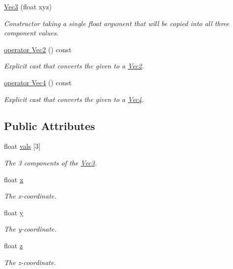 \begin{DoxyCompactItemize}
\hyperlink{classgfxmath_1_1_vec3_aa9067613452e593627e33477cd4b63a3}{Vec3} (float xyz)
\begin{DoxyCompactList}\small\item\em Constructor taking a single float argument that will be copied into all three component values. \end{DoxyCompactList}\item 
\hyperlink{classgfxmath_1_1_vec3_a75e16fdee00a8ad1c6bb3e8d129bf9a5}{operator Vec2} () const 
\begin{DoxyCompactList}\small\item\em Explicit cast that converts the given to a \hyperlink{classgfxmath_1_1_vec2}{Vec2}. \end{DoxyCompactList}\item 
\hyperlink{classgfxmath_1_1_vec3_a63202163a9e528a6bd3a432b3b4ca686}{operator Vec4} () const 
\begin{DoxyCompactList}\small\item\em Explicit cast that converts the given to a \hyperlink{classgfxmath_1_1_vec4}{Vec4}. \end{DoxyCompactList}\end{DoxyCompactItemize}
\subsection*{Public Attributes}
\begin{DoxyCompactItemize}
\item 
float \hyperlink{classgfxmath_1_1_vec3_a9ce2feb7167c9fd1d521838da1daa7f9}{vals} \mbox{[}3\mbox{]}
\begin{DoxyCompactList}\small\item\em The 3 components of the \hyperlink{classgfxmath_1_1_vec3}{Vec3}. \end{DoxyCompactList}\item 
float \hyperlink{classgfxmath_1_1_vec3_adb7cecf3b6d25eecf3924583f41d8c3a}{x}
\begin{DoxyCompactList}\small\item\em The x-\/coordinate. \end{DoxyCompactList}\item 
float \hyperlink{classgfxmath_1_1_vec3_a398bee406395fdc1ad381f5b70d7fd99}{y}
\begin{DoxyCompactList}\small\item\em The y-\/coordinate. \end{DoxyCompactList}\item 
float \hyperlink{classgfxmath_1_1_vec3_a93c1920712889d4f10520c7dc76a79c7}{z}
\begin{DoxyCompactList}\small\item\em The z-\/coordinate. \end{DoxyCompactList}\end{DoxyCompactItemize}
